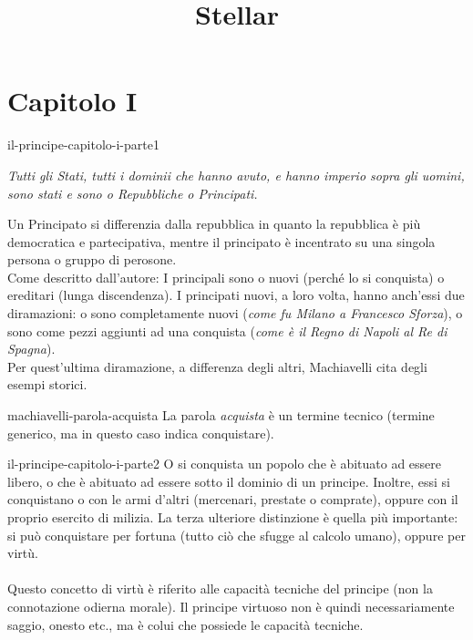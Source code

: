 \documentclass[preview]{standalone}
\begin{document}
\title{Stellar}
\genpage

\section{Capitolo I}

\begin{snippet}{il-principe-capitolo-i-parte1}
    \begin{center}
        \begin{minipage}{0.75\textwidth}
            \itshape
            Tutti gli Stati, tutti i dominii che hanno avuto, e hanno imperio sopra gli uomini, sono stati e sono o Repubbliche o Principati.
        \end{minipage}
    \end{center}
    \vspace{0.25cm}
    Un Principato si differenzia dalla repubblica in quanto la repubblica è più democratica e partecipativa,
    mentre il principato è incentrato su una singola persona o gruppo di perosone. \\
    Come descritto dall'autore: I principali sono o nuovi (perché lo si conquista) o ereditari (lunga discendenza).
    I principati nuovi, a loro volta, hanno anch'essi due diramazioni:
    o sono completamente nuovi (\textit{come fu Milano a Francesco Sforza}),
    o sono come pezzi aggiunti ad una conquista
    (\textit{come è il Regno di Napoli al Re di Spagna}). \\
    Per quest'ultima diramazione, a differenza degli altri, Machiavelli cita degli esempi storici.
\end{snippet}

\begin{snippetnote}{machiavelli-parola-acquista}{}
    La parola \textit{acquista} è un termine tecnico (termine generico, ma in questo caso indica conquistare).
\end{snippetnote}

\begin{snippet}{il-principe-capitolo-i-parte2}
    O si conquista un popolo che è abituato ad essere libero, o che è abituato ad
    essere sotto il dominio di un principe.
    Inoltre, essi si conquistano o con le armi d'altri (mercenari, prestate o comprate),
    oppure con il proprio esercito di milizia.
    La terza ulteriore distinzione è quella più importante: si può conquistare per fortuna (tutto ciò che sfugge al calcolo umano),
    oppure per virtù.
    \\\\
    Questo concetto di virtù è riferito alle capacità tecniche del principe (non la connotazione odierna morale).
    Il principe virtuoso non è quindi necessariamente saggio, onesto etc., ma è colui che
    possiede le capacità tecniche.
\end{snippet}
\end{document}
